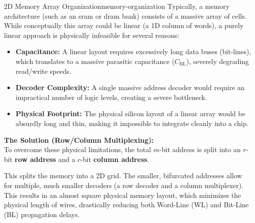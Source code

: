 \begin{concept}{2D Memory Array Organization}{memory-organization}
    Typically, a memory architecture (such as an \gls{sram} or \gls{dram} bank) consists of a massive array of cells. While conceptually this array could be linear (a 1D column of words), a purely linear approach is physically infeasible for several reasons:
    \begin{itemize}
        \item \textbf{Capacitance:} A linear layout requires excessively long data buses (bit-lines), which translates to a massive parasitic capacitance (\(C_{\text{BL}}\)), severely degrading read/write speeds.
        \item \textbf{Decoder Complexity:} A single massive address decoder would require an impractical number of logic levels, creating a severe bottleneck.
        \item \textbf{Physical Footprint:} The physical silicon layout of a linear array would be absurdly long and thin, making it impossible to integrate cleanly into a chip.
    \end{itemize}
    
    \noindent \textbf{The Solution (Row/Column Multiplexing):}\\
    To overcome these physical limitations, the total \(m\)-bit address is split into an \(r\)-bit \textbf{row address} and a \(c\)-bit \textbf{column address}. 
    
    This splits the memory into a 2D grid. The smaller, bifurcated addresses allow for multiple, much smaller decoders (a row decoder and a column multiplexer). This results in an almost square physical memory layout, which minimizes the physical length of wires, drastically reducing both Word-Line (WL) and Bit-Line (BL) propagation delays.
\end{concept}

